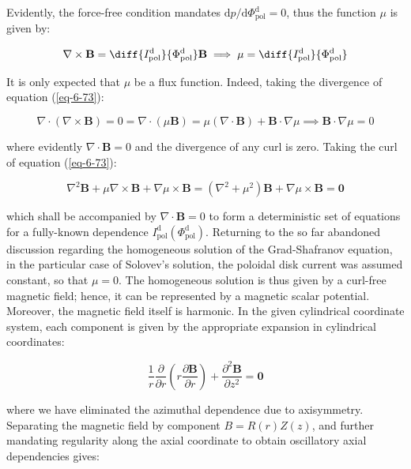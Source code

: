 Evidently, the force-free condition mandates $\mathrm{d}p/\mathrm{d}\Phi_\text{pol}^\mathrm{d}=0$, thus the function $\mu$ is given by:

\begin{equation}
    \nabla\times\mathbf{B}=\diff{I_\text{pol}^\mathrm{d}}{\Phi_\text{pol}^\mathrm{d}}\mathbf{B}\implies\mu=\diff{I_\text{pol}^\mathrm{d}}{\Phi_\text{pol}^\mathrm{d}}
\end{equation}

It is only expected that $\mu$ be a flux function. Indeed, taking the divergence of equation (\ref{eq-6-73}):

\begin{equation}
    \nabla\cdot\left(\nabla\times\mathbf{B}\right)=0=\nabla\cdot(\mu\mathbf{B})=\mu(\nabla\cdot\mathbf{B})+\mathbf{B}\cdot\nabla\mu\implies\mathbf{B}\cdot\nabla\mu=0
\end{equation}

where evidently $\nabla\cdot\mathbf{B}=0$ and the divergence of any curl is zero. Taking the curl of equation (\ref{eq-6-73}):

\begin{equation}
    \nabla^2\mathbf{B}+\mu\nabla\times\mathbf{B}+\nabla\mu\times\mathbf{B}=(\nabla^2+\mu^2)\mathbf{B}+\nabla\mu\times\mathbf{B}=\mathbf{0}
\end{equation}

which shall be accompanied by $\nabla\cdot\mathbf{B}=0$ to form a deterministic set of equations for a fully-known dependence $I_\text{pol}^\mathrm{d}(\Phi_\text{pol}^\mathrm{d})$. Returning to the so far abandoned discussion regarding the homogeneous solution of the Grad-Shafranov equation, in the particular case of Solovev's solution, the poloidal disk current was assumed constant, so that $\mu=0$. The homogeneous solution is thus given by a curl-free magnetic field; hence, it can be represented by a magnetic scalar potential. Moreover, the magnetic field itself is harmonic. In the given cylindrical coordinate system, each component is given by the appropriate expansion in cylindrical coordinates:

\begin{equation}
    \frac{1}{r}\frac{\partial}{\partial r}\left(r\frac{\partial\mathbf{B}}{\partial r}\right)+\frac{\partial^2\mathbf{B}}{\partial z^2}=\mathbf{0}
\end{equation}

where we have eliminated the azimuthal dependence due to axisymmetry. Separating the magnetic field by component $B=R(r)Z(z)$, and further mandating regularity along the axial coordinate to obtain oscillatory axial dependencies gives:

